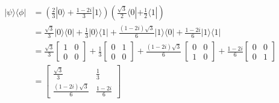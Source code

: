 \begin{align*}
    |\psi\rangle\langle\phi| & = \left(\frac{2}{3}|0\rangle+\frac{1-2i}{3}|1\rangle\right)\left(\frac{\sqrt{3}}{2}\langle0|+\frac{1}{2}\langle1|\right)                               \\
                             & = \frac{\sqrt{3}}{3}|0\rangle\langle0| + \frac{1}{3}|0\rangle\langle1| + \frac{(1-2i)\sqrt{3}}{6}|1\rangle\langle0| + \frac{1-2i}{6}|1\rangle\langle1| \\
                             & = \frac{\sqrt{3}}{3} \begin{bmatrix}
                                                        1 & 0 \\
                                                        0 & 0
                                                    \end{bmatrix}
    + \frac{1}{3} \begin{bmatrix}
                      0 & 1 \\
                      0 & 0
                  \end{bmatrix}
    + \frac{(1-2i)\sqrt{3}}{6} \
    \begin{bmatrix}
        0 & 0 \\
        1 & 0
    \end{bmatrix}
    + \frac{1-2i}{6} \begin{bmatrix}
                         0 & 0 \\
                         0 & 1
                     \end{bmatrix}                                                                                                                                                   \\
                             & = \begin{bmatrix}
                                     \frac{\sqrt{3}}{3}       & \frac{1}{3}    \\
                                     \frac{(1-2i)\sqrt{3}}{6} & \frac{1-2i}{6}
                                 \end{bmatrix}
\end{align*}

